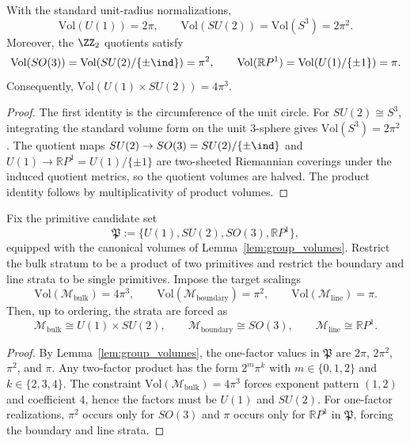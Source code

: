 \begin{lemma}\label{lem:group_volumes}
With the standard unit-radius normalizations,
\[
\mathrm{Vol}(U(1))=2\pi,\qquad
\mathrm{Vol}(SU(2))=\mathrm{Vol}(S^3)=2\pi^2.
\]
Moreover, the $\ZZ_2$ quotients satisfy
\[
\mathrm{Vol}(SO(3))=\mathrm{Vol}(SU(2)/\{\pm \ind\})=\pi^2,\qquad
\mathrm{Vol}(\mathbb{R}P^1)=\mathrm{Vol}(U(1)/\{\pm 1\})=\pi.
\]
Consequently, $\mathrm{Vol}(U(1)\times SU(2))=4\pi^3$.
\end{lemma}
\begin{proof}
The first identity is the circumference of the unit circle.
For $SU(2)\cong S^3$, integrating the standard volume form on the unit $3$-sphere gives $\mathrm{Vol}(S^3)=2\pi^2$ \cite{Nakahara2003,HallLieGroups2015}.
The quotient maps $SU(2)\to SO(3)=SU(2)/\{\pm \ind\}$ and $U(1)\to \mathbb{R}P^1=U(1)/\{\pm 1\}$ are two-sheeted Riemannian coverings under the induced quotient metrics, so the quotient volumes are halved.
The product identity follows by multiplicativity of product volumes.
\end{proof}

\begin{proposition}\label{prop:alpha_phase_factorization_rigidity}
Fix the primitive candidate set
\[
\mathfrak{P}:=\{U(1),SU(2),SO(3),\mathbb{R}P^1\},
\]
equipped with the canonical volumes of Lemma~\ref{lem:group_volumes}.
Restrict the bulk stratum to be a product of two primitives and restrict the boundary and line strata to be single primitives.
Impose the target scalings
\[
\mathrm{Vol}(\mathcal{M}_{\mathrm{bulk}})=4\pi^3,\qquad
\mathrm{Vol}(\mathcal{M}_{\mathrm{boundary}})=\pi^2,\qquad
\mathrm{Vol}(\mathcal{M}_{\mathrm{line}})=\pi.
\]
Then, up to ordering, the strata are forced as
\[
\mathcal{M}_{\mathrm{bulk}}\cong U(1)\times SU(2),\qquad
\mathcal{M}_{\mathrm{boundary}}\cong SO(3),\qquad
\mathcal{M}_{\mathrm{line}}\cong \mathbb{R}P^1.
\]
\end{proposition}
\begin{proof}
By Lemma~\ref{lem:group_volumes}, the one-factor values in $\mathfrak{P}$ are $2\pi$, $2\pi^2$, $\pi^2$, and $\pi$.
Any two-factor product has the form $2^m\pi^k$ with $m\in\{0,1,2\}$ and $k\in\{2,3,4\}$.
The constraint $\mathrm{Vol}(\mathcal{M}_{\mathrm{bulk}})=4\pi^3$ forces exponent pattern $(1,2)$ and coefficient $4$, hence the factors must be $U(1)$ and $SU(2)$.
For one-factor realizations, $\pi^2$ occurs only for $SO(3)$ and $\pi$ occurs only for $\mathbb{R}P^1$ in $\mathfrak{P}$, forcing the boundary and line strata.
\end{proof}


